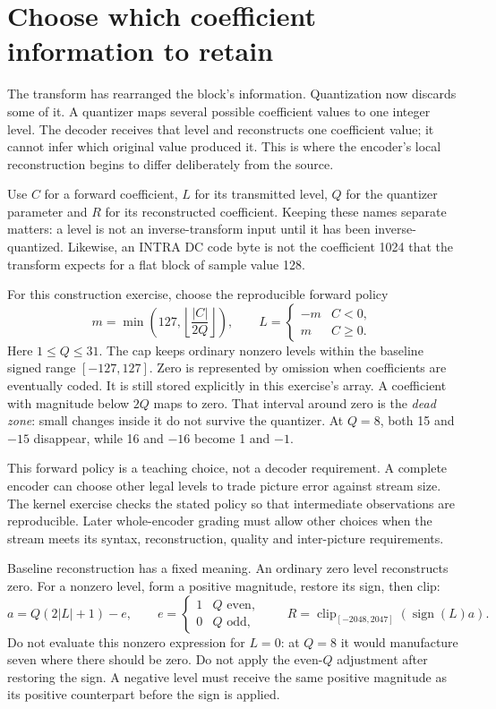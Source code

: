 \section{Choose which coefficient information to retain}
The transform has rearranged the block's information. Quantization now discards
some of it. A quantizer maps several possible coefficient values to one integer
level. The decoder receives that level and reconstructs one coefficient value;
it cannot infer which original value produced it. This is where the encoder's
local reconstruction begins to differ deliberately from the source.

Use $C$ for a forward coefficient, $L$ for its transmitted level, $Q$ for the
quantizer parameter and $R$ for its reconstructed coefficient. Keeping these
names separate matters: a level is not an inverse-transform input until it has
been inverse-quantized. Likewise, an INTRA DC code byte is not the coefficient
1024 that the transform expects for a flat block of sample value 128.

For this construction exercise, choose the reproducible forward policy
\[
 m=\min\left(127,\left\lfloor\frac{|C|}{2Q}\right\rfloor\right),
 \qquad L=\begin{cases}-m&C<0,\\m&C\geq0.\end{cases}
\]
Here $1\leq Q\leq31$. The cap keeps ordinary nonzero levels within the baseline
signed range $[-127,127]$. Zero is represented by omission when coefficients
are eventually coded. It is still stored explicitly in this exercise's array.
A coefficient with magnitude below $2Q$ maps to zero. That interval around zero
is the \emph{dead zone}: small changes inside it do not survive the quantizer.
At $Q=8$, both 15 and $-15$ disappear, while 16 and $-16$ become 1 and $-1$.

This forward policy is a teaching choice, not a decoder requirement. A complete
encoder can choose other legal levels to trade picture error against stream size.
The kernel exercise checks the stated policy so that intermediate observations
are reproducible. Later whole-encoder grading must allow other choices when the
stream meets its syntax, reconstruction, quality and inter-picture requirements.

Baseline reconstruction has a fixed meaning. An ordinary zero level reconstructs
zero. For a nonzero level, form a positive magnitude, restore its sign, then clip:
\[
 a=Q(2|L|+1)-e,\qquad
 e=\begin{cases}1&Q\text{ even},\\0&Q\text{ odd},\end{cases}
 \qquad R=\operatorname{clip}_{[-2048,2047]}\!\left(\operatorname{sign}(L)a\right).
\]
Do not evaluate this nonzero expression for $L=0$: at $Q=8$ it would manufacture
seven where there should be zero. Do not apply the even-$Q$ adjustment after
restoring the sign. A negative level must receive the same positive magnitude
as its positive counterpart before the sign is applied.

